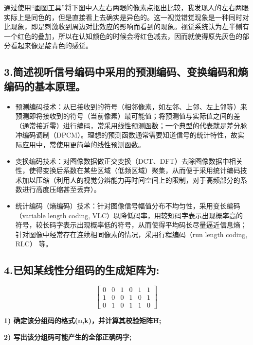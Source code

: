 \documentclass[]{article}
\begin{document}
    通过使用“画图工具”将下图中人左右两眼的像素点抠出比较，我发现人的左右两眼实际上是同色的，但是直接看上去确实是异色的。这一视觉错觉现象是一种同时对比现象，即是刺激收到周边对比效应的影响而看到的现象。视觉系统认为左半侧有一个红色的叠加，所以在认知颜色的时候会将红色减去，因而就使得原先灰色的部分看起来像是靛青色的感觉。

\hypertarget{header-n94}{%
\subsection{3.简述视听信号编码中采用的预测编码、变换编码和熵编码的基本原理。}\label{header-n94}}

\begin{itemize}
\item
    预测编码技术：从已接收到的符号（相邻像素，如左邻、上邻、左上邻等）来预测即将接收到的符号（当前像素）最可能值；将预测值与实际值之间的差（通常接近零）进行编码，常采用线性预测函数；一个典型的代表就是差分脉冲编码调制（DPCM）。理想的预测函数通常需要知道信号的统计特性，故实际应用中，常使用更简单的线性预测函数。

\item
    变换编码技术：对图像数据做正交变换（DCT、DFT）去除图像数据中相关性，使得变换后系数在某些区域（低频区域）聚集，从而便于采用统计编码技术加以压缩（利用人的视觉分辨能力再时间空间上的限制，对于高频部分的系数进行高度压缩甚至丢弃）。

\item
    统计编码（熵编码）技术：针对图像信号幅值分布不均匀性，采用变长编码（variable length coding, VLC）以降低码率，用较短码字表示出现概率高的符号，较长码字表示出现概率低的符号，从而使得平均码长尽量逼近信息熵；针对图像中经常存在连续相同像素的情况，采用行程编码（run length coding, RLC） 等。

\end{itemize}
\hypertarget{header-n102}{%
\subsection{4.已知某线性分组码的生成矩阵为:}\label{header-n102}} 
$$
\begin{bmatrix}0 & 0 & 1 & 0 & 1 & 1 \\ 1 & 0 & 0 & 1 & 0 & 1 \\ 0 & 1 & 0 & 1 & 1 & 0 \end{bmatrix}
$$

\textbf{1) 确定该分组码的格式(n,k)，并计算其校验矩阵H;}

\textbf{2) 写出该分组码可能产生的全部正确码字;}
\end{document}
